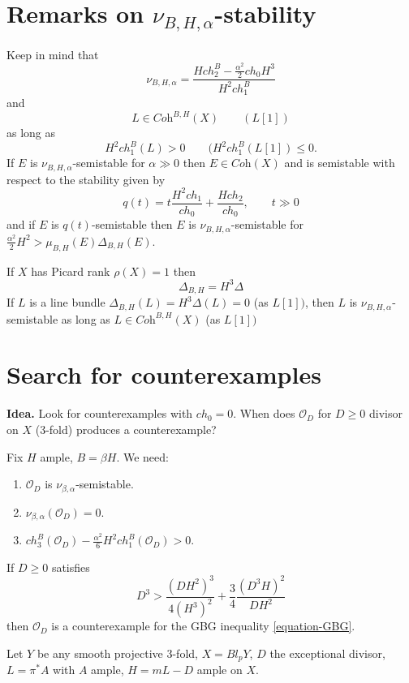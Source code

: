\section{Remarks on $\nu_{B,H,\alpha}$-stability}
\label{section-remarks-on-nu-BHalpha-stability}
Keep in mind that
$$
\nu_{B,H,\alpha}=\frac{Hch_2^B-\frac{\alpha^2}{2}ch_0H^3}
{H^2 ch_1^B}
$$
and
$$
L \in \textit{Coh}^{B,H}(X) \qquad (L[1])
$$
as long as
$$
H^2ch_1^B(L)>0 \qquad (H^2ch_1^B(L[1])\leq 0.
$$
\medskip
If $E$ is $\nu_{B,H,\alpha}$-semistable for $\alpha\gg 0$ then 
$E\in\textit{Coh}(X)$ and is semistable with respect to the stability given by
$$
q(t)=t \frac{H^2 ch_1}{ch_0}+ \frac{H ch_2}{ch_0},\qquad t\gg 0
$$
and if $E$ is $q(t)$-semistable then $E$ is $\nu_{B,H,\alpha}$-semistable for 
$\frac{\alpha^2}{2}H^2>\mu_{B,H}(E)\Delta_{B,H}(E)$.

If $X$ has Picard rank $\rho(X)=1$ then 
 $$
\Delta_{B,H}=H^3\Delta
$$
If $L$ is a line bundle $\Delta_{B,H}(L)=H^3\Delta(L)=0$ (as $L[1])$, 
then $L$ is 
$\nu_{B,H,\alpha}$-semistable as long as $L \in \textit{Coh}^{B,H}(X)$ 
(as $L[1])$

\section{Search for counterexamples}
\label{section-search-for-counterexamples}

{\bf Idea.} Look for counterexamples with $ch_0=0$. When does $\mathcal{O}_D$
for $D\geq 0$ divisor on $X$ (3-fold) produces a counterexample?

Fix $H$ ample, $B=\beta H$. We need:
\begin{enumerate}
\item $\mathcal{O}_D$ is $\nu_{\beta,\alpha}$-semistable.
\item $\nu_{\beta,\alpha}(\mathcal{O}_D)=0$.
\item $ch_3^B(\mathcal{O}_D)-\frac{\alpha^2}{6}H^2ch_1^B(\mathcal{O}_D)>0$.
\end{enumerate}

\begin{lemma}
\label{lemma-counterexample}
If $D \geq 0$ satisfies
$$
D^3>\frac{(DH^2)^3}{4(H^3)^2}+\frac{3}{4}\frac{(D^3H)^2}{DH^2}
$$
then $\mathcal{O}_D$ is a counterexample for the GBG inequality
\ref{equation-GBG}.
\end{lemma}

\begin{example}
\label{example-}
Let $Y$ be any smooth projective 3-fold, $X=Bl_pY$, $D$ the exceptional divisor,
$L=\pi^*A$ with $A$ ample, $H=mL-D$ ample on $X$.
\end{example}

